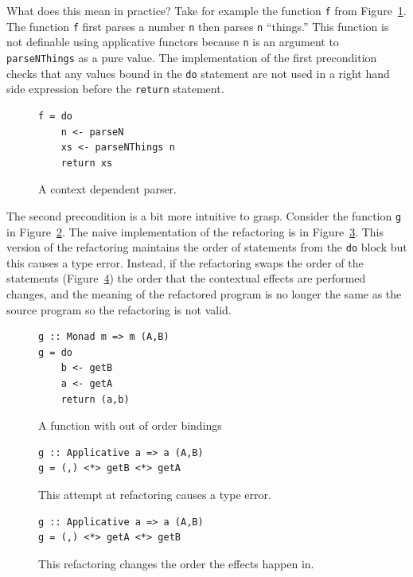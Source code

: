 What does this mean in practice? Take for example the function \texttt{f} from Figure~\ref{parseNThings}. The function \texttt{f} first parses a number \texttt{n} then parses \texttt{n} ``things.'' This function is not definable using applicative functors because \texttt{n} is an argument to \texttt{parseNThings} as a pure value. The implementation of the first precondition checks that any values bound in the \texttt{do} statement are not used in a right hand side expression before the \texttt{return} statement. 


\begin{figure}[t]
\begin{lstlisting}
f = do
	n <- parseN
	xs <- parseNThings n
	return xs
\end{lstlisting} 
\caption{A context dependent parser.}
\label{parseNThings}
\end{figure}

The second precondition is a bit more intuitive to grasp. Consider the function \texttt{g} in Figure~\ref{outOrd}. The naive implementation of the refactoring is in Figure~\ref{outOrd_ref1}. This version of the refactoring maintains the order of statements from the \texttt{do} block but this causes a type error. Instead, if the refactoring swaps the order of the statements (Figure~\ref{outOrd_ref2}) the order that the contextual effects are performed changes, and the meaning of the refactored program is no longer the same as the source program so the refactoring is not valid. 

\begin{figure}[t]
\begin{lstlisting}
g :: Monad m => m (A,B)
g = do
	b <- getB
	a <- getA
	return (a,b)
\end{lstlisting}
\caption{A function with out of order bindings}
\label{outOrd}
\end{figure}

\begin{figure}[t]
\begin{lstlisting}
g :: Applicative a => a (A,B)
g = (,) <*> getB <*> getA
\end{lstlisting}
\caption{This attempt at refactoring causes a type error.}
\label{outOrd_ref1}
\end{figure}

\begin{figure}[t]
\begin{lstlisting}
g :: Applicative a => a (A,B)
g = (,) <*> getA <*> getB
\end{lstlisting} 
\caption{This refactoring changes the order the effects happen in.}
\label{outOrd_ref2}
\end{figure}

